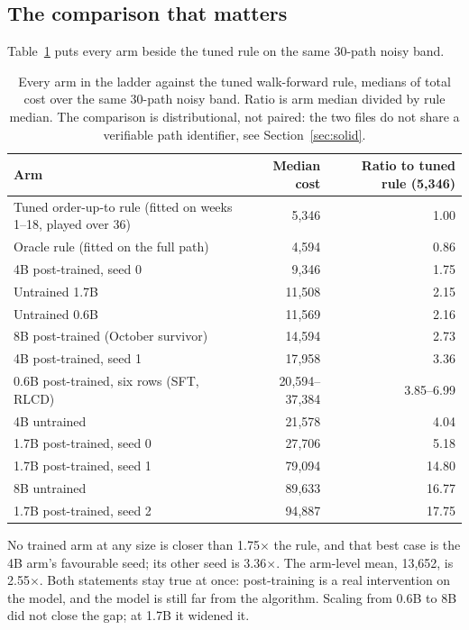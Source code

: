 \documentclass[11pt]{article}
\begin{document}
\subsection{The comparison that matters}

Table~\ref{tab:formula} puts every arm beside the tuned rule on the same 30-path noisy band.

\begin{table}[ht]
\centering
\caption{Every arm in the ladder against the tuned walk-forward rule, medians of total cost over the
same 30-path noisy band. Ratio is arm median divided by rule median. The comparison is distributional,
not paired: the two files do not share a verifiable path identifier, see Section~\ref{sec:solid}.}
\label{tab:formula}
\small
\begin{tabular}{@{}lrr@{}}
\toprule
Arm & Median cost & Ratio to tuned rule (5{,}346) \\
\midrule
Tuned order-up-to rule (fitted on weeks 1--18, played over 36) & 5{,}346 & 1.00 \\
Oracle rule (fitted on the full path) & 4{,}594 & 0.86 \\
\midrule
4B post-trained, seed 0 & 9{,}346 & 1.75 \\
Untrained 1.7B & 11{,}508 & 2.15 \\
Untrained 0.6B & 11{,}569 & 2.16 \\
8B post-trained (October survivor) & 14{,}594 & 2.73 \\
4B post-trained, seed 1 & 17{,}958 & 3.36 \\
0.6B post-trained, six rows (SFT, RLCD) & 20{,}594--37{,}384 & 3.85--6.99 \\
4B untrained & 21{,}578 & 4.04 \\
1.7B post-trained, seed 0 & 27{,}706 & 5.18 \\
1.7B post-trained, seed 1 & 79{,}094 & 14.80 \\
8B untrained & 89{,}633 & 16.77 \\
1.7B post-trained, seed 2 & 94{,}887 & 17.75 \\
\bottomrule
\end{tabular}
\end{table}

No trained arm at any size is closer than 1.75$\times$ the rule, and that best case is the 4B arm's
favourable seed; its other seed is 3.36$\times$. The arm-level mean, 13{,}652, is 2.55$\times$. Both
statements stay true at once: post-training is a real intervention on the model, and the model is
still far from the algorithm. Scaling from 0.6B to 8B did not close the gap; at 1.7B it widened it.
\end{document}
